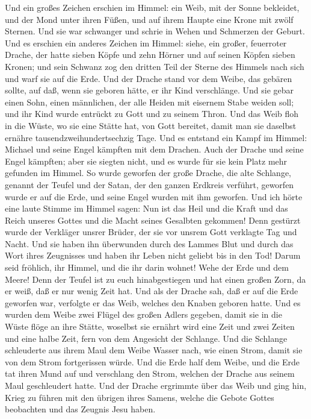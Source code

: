  Und ein großes Zeichen erschien im Himmel: ein Weib, mit
der Sonne bekleidet, und der Mond unter ihren Füßen, und auf ihrem
Haupte eine Krone mit zwölf Sternen.  Und sie war
schwanger und schrie in Wehen und Schmerzen der Geburt. 
Und es erschien ein anderes Zeichen im Himmel: siehe, ein großer,
feuerroter Drache, der hatte sieben Köpfe und zehn Hörner und auf seinen
Köpfen sieben Kronen;  und sein Schwanz zog den dritten
Teil der Sterne des Himmels nach sich und warf sie auf die Erde. Und der
Drache stand vor dem Weibe, das gebären sollte, auf daß, wenn sie
geboren hätte, er ihr Kind verschlänge.  Und sie gebar
einen Sohn, einen männlichen, der alle Heiden mit eisernem Stabe weiden
soll; und ihr Kind wurde entrückt zu Gott und zu seinem Thron.
 Und das Weib floh in die Wüste, wo sie eine Stätte hat,
von Gott bereitet, damit man sie daselbst ernähre
tausendzweihundertsechzig Tage.  Und es entstand ein Kampf
im Himmel: Michael und seine Engel kämpften mit dem Drachen. Auch der
Drache und seine Engel kämpften;  aber sie siegten nicht,
und es wurde für sie kein Platz mehr gefunden im Himmel. 
So wurde geworfen der große Drache, die alte Schlange, genannt der
Teufel und der Satan, der den ganzen Erdkreis verführt, geworfen wurde
er auf die Erde, und seine Engel wurden mit ihm geworfen.
 Und ich hörte eine laute Stimme im Himmel sagen: Nun ist
das Heil und die Kraft und das Reich unseres Gottes und die Macht seines
Gesalbten gekommen! Denn gestürzt wurde der Verkläger unsrer Brüder, der
sie vor unsrem Gott verklagte Tag und Nacht.  Und sie
haben ihn überwunden durch des Lammes Blut und durch das Wort ihres
Zeugnisses und haben ihr Leben nicht geliebt bis in den Tod!
 Darum seid fröhlich, ihr Himmel, und die ihr darin
wohnet! Wehe der Erde und dem Meere! Denn der Teufel ist zu euch
hinabgestiegen und hat einen großen Zorn, da er weiß, daß er nur wenig
Zeit hat.  Und als der Drache sah, daß er auf die Erde
geworfen war, verfolgte er das Weib, welches den Knaben geboren hatte.
 Und es wurden dem Weibe zwei Flügel des großen Adlers
gegeben, damit sie in die Wüste flöge an ihre Stätte, woselbst sie
ernährt wird eine Zeit und zwei Zeiten und eine halbe Zeit, fern von dem
Angesicht der Schlange.  Und die Schlange schleuderte aus
ihrem Maul dem Weibe Wasser nach, wie einen Strom, damit sie von dem
Strom fortgerissen würde.  Und die Erde half dem Weibe,
und die Erde tat ihren Mund auf und verschlang den Strom, welchen der
Drache aus seinem Maul geschleudert hatte.  Und der
Drache ergrimmte über das Weib und ging hin, Krieg zu führen mit den
übrigen ihres Samens, welche die Gebote Gottes beobachten und das
Zeugnis Jesu haben.

